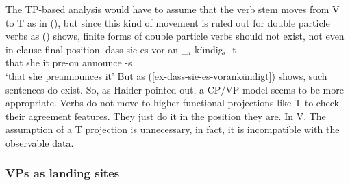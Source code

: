 The TP-based analysis would have to assume that the verb stem  moves from V to T as in (), but
since this kind of movement is ruled out for double particle verbs as () shows, finite forms
of double particle verbs should not exist, not even in clause final position.
\ea 
\gll dass sie es vor-an \_$_i$ kündig$_i$ -t\\
     that she it pre-on {}    announce -s\\
\glt `that she preannounces it'
\z
But as (\ref{ex-dass-sie-es-vorankündigt}) shows, such sentences do exist. So, as Haider pointed
out, a CP/VP model seems to be more appropriate. Verbs do not move to higher functional projections
like T to check their agreement features. They just do it in the position they are. In V. The
assumption of a T projection is unnecessary, in fact, it is incompatible with the observable data.

\subsubsection{VPs as landing sites}
\label{sec-cp-tp-vp-extraposition}


